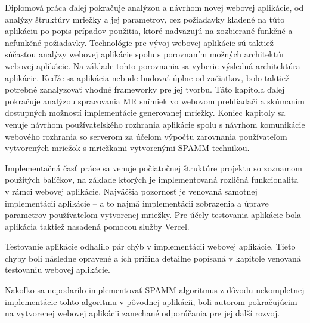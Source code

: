 Diplomová práca ďalej pokračuje analýzou a návrhom novej webovej aplikácie, od analýzy štruktúry mriežky a jej parametrov, cez požiadavky kladené na túto aplikáciu po popis prípadov použitia, ktoré nadväzujú na zozbierané funkčné a nefunkčné požiadavky. Technológie pre vývoj webovej aplikácie sú taktiež súčasťou analýzy webovej aplikácie spolu s porovnaním možných architektúr webovej aplikácie. Na základe tohto porovnania sa vyberie výsledná architektúra aplikácie. Keďže sa aplikácia nebude budovať úplne od začiatkov, bolo taktiež potrebné zanalyzovať vhodné frameworky pre jej tvorbu. Táto kapitola ďalej pokračuje analýzou spracovania MR snímiek vo webovom prehliadači a skúmaním dostupných možností implementácie generovanej mriežky. Koniec kapitoly sa venuje návrhom používateľského rozhrania aplikácie spolu s návrhom komunikácie webového rozhrania so serverom za účelom výpočtu zarovnania používateľom vytvorených mriežok s mriežkami vytvorenými SPAMM technikou.

Implementačná časť práce sa venuje počiatočnej štruktúre projektu so zoznamom použitých balíčkov, na základe ktorých je implementovaná rozličná funkcionalita v rámci webovej aplikácie. Najväčšia pozornosť je venovaná samotnej implementácii aplikácie -- a to najmä implementácii zobrazenia a úprave parametrov používateľom vytvorenej mriežky. Pre účely testovania aplikácie bola aplikácia taktiež nasadená pomocou služby Vercel.

Testovanie aplikácie odhalilo pár chýb v implementácii webovej aplikácie. Tieto chyby boli následne opravené a ich príčina detailne popísaná v kapitole venovaná testovaniu webovej aplikácie.

Nakoľko sa nepodarilo implementovať SPAMM algoritmus z dôvodu nekompletnej implementácie tohto algoritmu v pôvodnej aplikácii, boli autorom pokračujúcim na vytvorenej webovej aplikácii zanechané odporúčania pre jej ďalší rozvoj.

